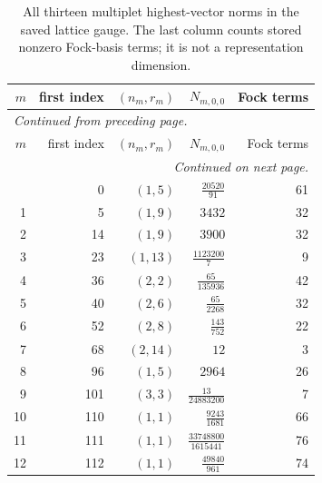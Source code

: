 \begingroup\small
\setlength{\tabcolsep}{5pt}
\begin{longtable}{rrrrr}
\caption{All thirteen multiplet highest-vector norms in the saved lattice gauge. The last column counts stored nonzero Fock-basis terms; it is not a representation dimension.}\label{expphysics:highest-norms}\\
\toprule
$m$ & first index & $(n_m,r_m)$ & $N_{m,0,0}$ & Fock terms\\
\midrule
\endfirsthead
\multicolumn{5}{l}{\small\itshape Continued from preceding page.}\\
\toprule
$m$ & first index & $(n_m,r_m)$ & $N_{m,0,0}$ & Fock terms\\
\midrule
\endhead
\midrule
\multicolumn{5}{r}{\small\itshape Continued on next page.}\\
\endfoot
\bottomrule
\endlastfoot
0 & 0 & $( 1,5)$ & $\frac{20520}{91}$ & 61\\
1 & 5 & $( 1,9)$ & $3432$ & 32\\
2 & 14 & $( 1,9)$ & $3900$ & 32\\
3 & 23 & $( 1,13)$ & $\frac{1123200}{7}$ & 9\\
4 & 36 & $( 2,2)$ & $\frac{65}{135936}$ & 42\\
5 & 40 & $( 2,6)$ & $\frac{65}{2268}$ & 32\\
6 & 52 & $( 2,8)$ & $\frac{143}{752}$ & 22\\
7 & 68 & $( 2,14)$ & $12$ & 3\\
8 & 96 & $( 1,5)$ & $2964$ & 26\\
9 & 101 & $( 3,3)$ & $\frac{13}{24883200}$ & 7\\
10 & 110 & $( 1,1)$ & $\frac{9243}{1681}$ & 66\\
11 & 111 & $( 1,1)$ & $\frac{33748800}{1615441}$ & 76\\
12 & 112 & $( 1,1)$ & $\frac{49840}{961}$ & 74\\
\end{longtable}
\endgroup
